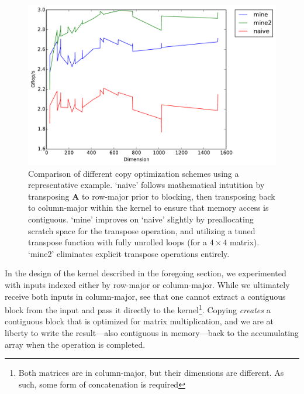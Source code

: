 \documentclass{scrartcl}
\begin{document}
  \begin{figure}[ht!]
    \centering
    \includegraphics[width=\textwidth]{timing-malloc-comparison}
    \caption{Comparison of different copy optimization schemes using a representative example. `naive' follows mathematical intutition by transposing $\mathbf{A}$ to row-major prior to blocking, then transposing back to column-major within the kernel to ensure that memory access is contiguous. `mine' improves on `naive' slightly by preallocating scratch space for the transpose operation, and utilizing a tuned transpose function with fully unrolled loops (for a $4 \times 4$ matrix). `mine2' eliminates explicit transpose operations entirely.\label{fig:avx-2}}
  \end{figure}

  In the design of the kernel described in the foregoing section, we experimented with inputs indexed either by row-major or column-major. While we ultimately receive both inputs in column-major, see that one cannot extract a contiguous block from the input and pass it directly to the kernel\footnote{Both matrices are in column-major, but their dimensions are different. As such, some form of concatenation is required}. Copying \emph{creates} a contiguous block that is optimized for matrix multiplication, and we are at liberty to write the result---also contiguous in memory---back to the accumulating array when the operation is completed.
\end{document}
